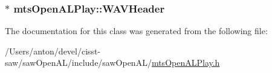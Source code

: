 \subsubsection[{W\+A\+V\+Header}]{$\ast$ mts\+Open\+A\+L\+Play\+::\+W\+A\+V\+Header\hspace{0.3cm}{\ttfamily [protected]}}\label{classmts_open_a_l_play_afd9605c7b660000eb488149bca497bff}


The documentation for this class was generated from the following file\+:\begin{DoxyCompactItemize}
\item 
/\+Users/anton/devel/cisst-\/saw/saw\+Open\+A\+L/include/saw\+Open\+A\+L/\hyperlink{mts_open_a_l_play_8h}{mts\+Open\+A\+L\+Play.\+h}\end{DoxyCompactItemize}
